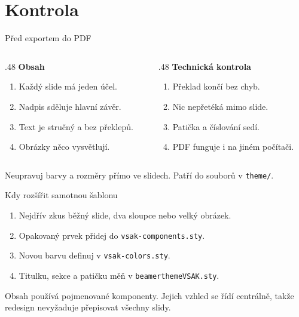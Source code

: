 \section{Kontrola}

\begin{frame}{Před exportem do PDF}
  \begin{columns}[T,totalwidth=\textwidth]
    \begin{column}{.48\textwidth}
      \textbf{Obsah}
      \begin{enumerate}
        \item Každý slide má jeden účel.
        \item Nadpis sděluje hlavní závěr.
        \item Text je stručný a bez překlepů.
        \item Obrázky něco vysvětlují.
      \end{enumerate}
    \end{column}
    \begin{column}{.48\textwidth}
      \textbf{Technická kontrola}
      \begin{enumerate}
        \item Překlad končí bez chyb.
        \item Nic nepřetéká mimo slide.
        \item Patička a číslování sedí.
        \item PDF funguje i na jiném počítači.
      \end{enumerate}
    \end{column}
  \end{columns}
  \vspace{4mm}
  \begin{Warning}
    Neupravuj barvy a rozměry přímo ve slidech. Patří do souborů v \texttt{theme/}.
  \end{Warning}
\end{frame}

\begin{frame}{Kdy rozšířit samotnou šablonu}
  \begin{enumerate}
    \item Nejdřív zkus běžný slide, dva sloupce nebo velký obrázek.
    \item Opakovaný prvek přidej do \texttt{vsak-components.sty}.
    \item Novou barvu definuj v \texttt{vsak-colors.sty}.
    \item Titulku, sekce a patičku měň v \texttt{beamerthemeVSAK.sty}.
  \end{enumerate}
  \vspace{4mm}
  \begin{Rule}
    Obsah používá pojmenované komponenty. Jejich vzhled se řídí centrálně, takže redesign nevyžaduje přepisovat všechny slidy.
  \end{Rule}
\end{frame}
